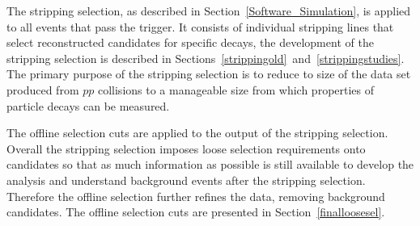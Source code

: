 The stripping selection, as described in Section~\ref{Software_Simulation}, is applied to all events that pass the trigger. It consists of individual stripping lines that select reconstructed candidates for specific decays, the development of the stripping selection is described in Sections~\ref{strippingold}~and~\ref{strippingstudies}. %
The primary purpose of the stripping selection is to reduce to size of the data set produced from $pp$ collisions to a manageable size from which properties of particle decays can be measured. 



The offline selection cuts are applied to the output of the stripping selection. Overall the stripping selection imposes loose selection requirements onto \bmumu candidates so that as much information as possible is still available to develop the analysis and understand background events after the stripping selection. Therefore the offline selection further refines the data, removing background candidates. The offline selection cuts are presented in Section~\ref{finalloosesel}. 


 



